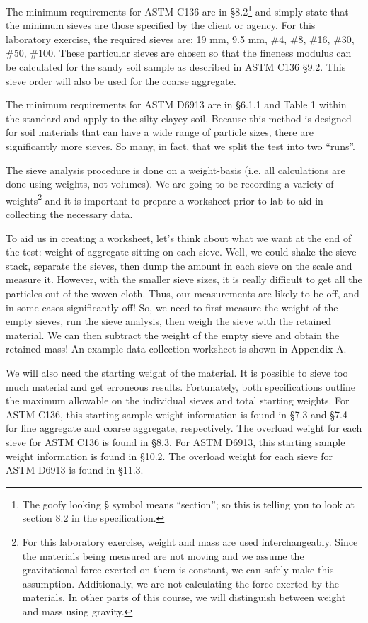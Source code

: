 \documentclass[12pt]{article}
\begin{document}
The minimum requirements for ASTM C136 are in \S8.2\footnote{The goofy looking \S{} symbol means ``section''; so this is telling you to look at section 8.2 in the specification.} and simply state that the minimum sieves are those specified by the client or agency. For this laboratory exercise, the required sieves are: 19 mm, 9.5 mm, \#4, \#8, \#16, \#30, \#50, \#100. These particular sieves are chosen so that the fineness modulus can be calculated for the sandy soil sample as described in ASTM C136 \S9.2. This sieve order will also be used for the coarse aggregate.

The minimum requirements for ASTM D6913 are in \S6.1.1 and Table 1 within the standard and apply to the silty-clayey soil. Because this method is designed for soil materials that can have a wide range of particle sizes, there are significantly more sieves. So many, in fact, that we split the test into two ``runs''.

The sieve analysis procedure is done on a weight-basis (i.e. all calculations are done using weights, not volumes). We are going to be recording a variety of weights\footnote{For this laboratory exercise, weight and mass are used interchangeably. Since the materials being measured are not moving and we assume the gravitational force exerted on them is constant, we can safely make this assumption. Additionally, we are not calculating the force exerted by the materials. In other parts of this course, we will distinguish between weight and mass using gravity.} and it is important to prepare a worksheet prior to lab to aid in collecting the necessary data.

To aid us in creating a worksheet, let's think about what we want at the end of the test: weight of aggregate sitting on each sieve. Well, we could shake the sieve stack, separate the sieves, then dump the amount in each sieve on the scale and measure it. However, with the smaller sieve sizes, it is really difficult to get all the particles out of the woven cloth. Thus, our measurements are likely to be off, and in some cases significantly off! So, we need to first measure the weight of the empty sieves, run the sieve analysis, then weigh the sieve with the retained material. We can then subtract the weight of the empty sieve and obtain the retained mass! An example data collection worksheet is shown in Appendix A.

We will also need the starting weight of the material. It is possible to sieve too much material and get erroneous results. Fortunately, both specifications outline the maximum allowable on the individual sieves and total starting weights. For ASTM C136, this starting sample weight information is found in \S7.3 and \S7.4 for fine aggregate and coarse aggregate, respectively. The overload weight for each sieve for ASTM C136 is found in \S8.3. For ASTM D6913, this starting sample weight information is found in \S10.2. The overload weight for each sieve for ASTM D6913 is found in \S11.3.
\end{document}
